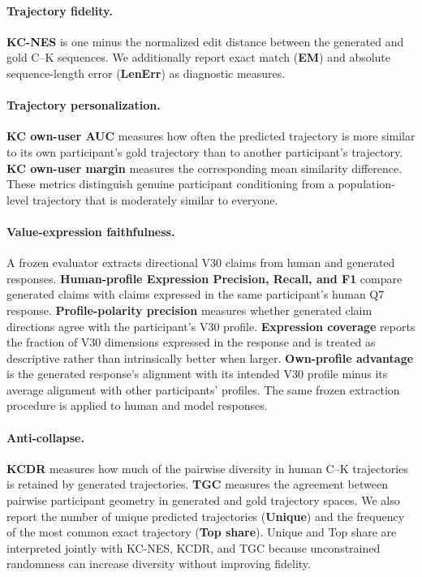 \paragraph{Trajectory fidelity.}
\textbf{KC-NES} is one minus the normalized edit distance between the
generated and gold C--K sequences. We additionally report exact match
(\textbf{EM}) and absolute sequence-length error (\textbf{LenErr}) as
diagnostic measures.

\paragraph{Trajectory personalization.}
\textbf{KC own-user AUC} measures how often the predicted trajectory is more
similar to its own participant's gold trajectory than to another
participant's trajectory. \textbf{KC own-user margin} measures the
corresponding mean similarity difference. These metrics distinguish genuine
participant conditioning from a population-level trajectory that is
moderately similar to everyone.

\paragraph{Value-expression faithfulness.}
A frozen evaluator extracts directional V30 claims from human and generated
responses. \textbf{Human-profile Expression Precision, Recall, and F1}
compare generated claims with claims expressed in the same participant's
human Q7 response. \textbf{Profile-polarity precision} measures whether
generated claim directions agree with the participant's V30 profile.
\textbf{Expression coverage} reports the fraction of V30 dimensions expressed
in the response and is treated as descriptive rather than intrinsically
better when larger. \textbf{Own-profile advantage} is the generated
response's alignment with its intended V30 profile minus its average
alignment with other participants' profiles. The same frozen extraction
procedure is applied to human and model responses.

\paragraph{Anti-collapse.}
\textbf{KCDR} measures how much of the pairwise diversity in human C--K
trajectories is retained by generated trajectories. \textbf{TGC} measures the
agreement between pairwise participant geometry in generated and gold
trajectory spaces. We also report the number of unique predicted trajectories
(\textbf{Unique}) and the frequency of the most common exact trajectory
(\textbf{Top share}). Unique and Top share are interpreted jointly with
KC-NES, KCDR, and TGC because unconstrained randomness can increase diversity
without improving fidelity.

